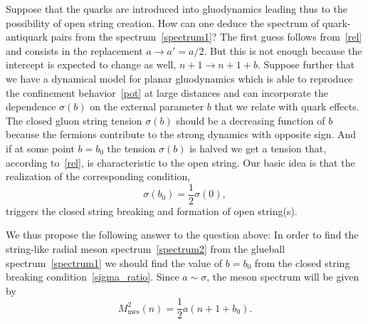 \documentclass[a4paper,11pt]{article}
\begin{document}
Suppose that the quarks are introduced into gluodynamics leading thus to the possibility of open string creation.
How can one deduce the spectrum of quark-antiquark pairs from the spectrum~\eqref{spectrum1}?
The first guess follows from~\eqref{rel} and consists in the replacement $a\rightarrow a'=a/2$.
But this is not enough because the intercept is expected
to change as well, $n+1\rightarrow n+1+b$. Suppose further that we have a dynamical model for planar gluodynamics
which is able to reproduce the confinement behavior~\eqref{pot} at large distances and can incorporate
the dependence $\sigma(b)$ on the external parameter $b$ that we relate with quark effects.
The closed gluon string tension $\sigma(b)$ should be a decreasing function of $b$
because the fermions contribute to the strong dynamics with opposite sign.
And if at some point $b=b_0$ the tension $\sigma(b)$ is halved we get a tension that, according to~\eqref{rel},
is characteristic to the open string. Our basic idea is that the realization of the
corresponding condition,
\begin{equation}
\label{sigma_ratio}
  \sigma(b_0)=\frac{1}{2}\sigma(0),
\end{equation}
triggers the closed string breaking and formation of open string(s).

We thus propose the following answer to the question above: In order to find the string-like radial meson spectrum~\eqref{spectrum2}
from the glueball spectrum~\eqref{spectrum1} we should find the value of $b=b_0$ from the closed string breaking condition~\eqref{sigma_ratio}.
Since $a\sim\sigma$, the meson spectrum will be given by
\begin{equation}
\label{spectrum3}
  M^2_\text{mes}(n)=\frac12 a(n+1+b_0).
\end{equation}

\end{document}
